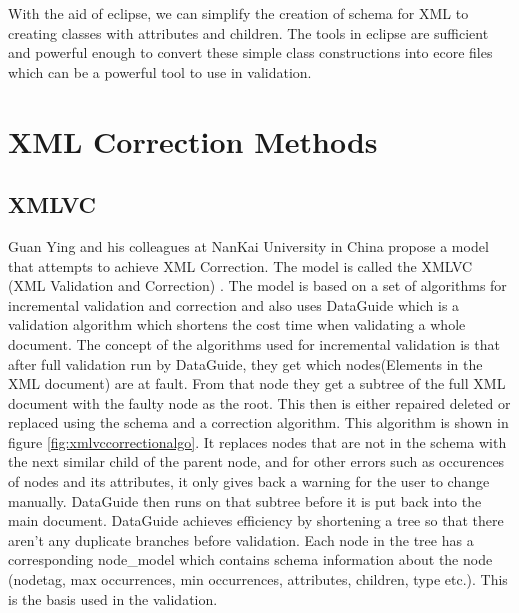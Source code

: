 \documentclass{report}
\begin{document}
With the aid of eclipse, we can simplify the creation of schema for XML to creating classes with attributes and children. The tools in eclipse are sufficient and powerful enough to convert these simple class constructions into ecore files which can be a powerful tool to use in validation.

\section{XML Correction Methods}
\subsection{XMLVC}

Guan Ying and his colleagues at NanKai University in China propose a model that attempts to achieve XML Correction. The model is called the XMLVC (XML Validation and Correction) \cite{ying2012xmlvc}. The model is based on a set of algorithms for incremental validation and correction and also uses DataGuide \cite{goldman1997dataguides} which is a validation algorithm which shortens the cost time when validating a whole document. The concept of the algorithms used for incremental validation is that after full validation run by DataGuide, they get which nodes(Elements in the XML document) are at fault. From that node they get a subtree of the full XML document with the faulty node as the root. This then is either repaired deleted or replaced using the schema and a correction algorithm. This algorithm is shown in figure \ref{fig:xmlvccorrectionalgo}. It replaces nodes that are not in the schema with the next similar child of the parent node, and for other errors such as occurences of nodes and its attributes, it only gives back a warning for the user to change manually. DataGuide then runs on that subtree before it is put back into the main document. DataGuide achieves efficiency by shortening a tree so that there aren't any duplicate branches before validation. Each node in the tree has a corresponding node\_model \cite{ying2012xmlvc} which contains schema information about the node (nodetag, max occurrences, min occurrences, attributes, children, type etc.). This is the basis used in the validation.
\end{document}

